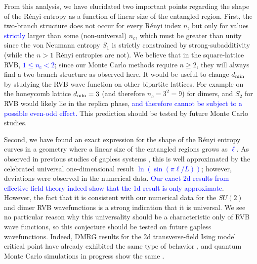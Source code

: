 \documentclass[11pt]{iopart}
\begin{document}
From this analysis, we have elucidated two important points regarding the shape of the Rényi entropy as a function of linear size of the entangled region.  
First, the two-branch structure does not occur for every Rényi index $n$, but only for values \textcolor{blue}{strictly} larger than some (non-universal) $n_c$, which must be greater than unity since the von Neumann entropy $S_1$ is strictly constrained by strong-subadditivity (while the $n>1$ Rényi entropies are not).  We believe that in the square-lattice RVB, \textcolor{blue}{$1\leq n_c<2$}; since our Monte Carlo methods require $n\ge 2$, they will always find a two-branch structure as observed here.  
It would be useful to change $d_{\rm min}$ by studying the RVB wave function on other bipartite lattices. For example on the honeycomb lattice $d_{\rm min}=3$ (and therefore $n_c=3^2=9$) for dimers, and $S_2$ for RVB would likely lie in the replica phase, \textcolor{blue}{and therefore cannot be subject to a possible even-odd effect.} 
This prediction should be tested by future Monte Carlo studies.

Second, we have found an exact expression for the shape of the Rényi entropy curves in a geometry where a linear size of the entangled regions grows as \textcolor{blue}{$\ell$}.  As observed in previous studies of gapless systems \cite{Ju2012}, this is well approximated by the celebrated universal one-dimensional result \textcolor{blue}{$\ln(\sin(\pi \ell /L))$}; however, deviations were observed in the numerical data.  \textcolor{blue}{Our exact 2d results from effective field theory indeed show that the 1d result is only approximate}. However, the fact that it is consistent with our numerical data for the $SU(2)$ and dimer RVB wavefunctions is a strong indication that  it is universal. We see no particular reason why this universality should be a characteristic only of RVB wave functions, so this conjecture should be tested on future gapless wavefunctions.  Indeed, DMRG results for the 2d transverse-field Ising model critical point have already exhibited the same type of behavior \cite{Konik}, and quantum 
Monte Carlo simulations in progress show the same \cite{RogTFIM}.
\end{document}
